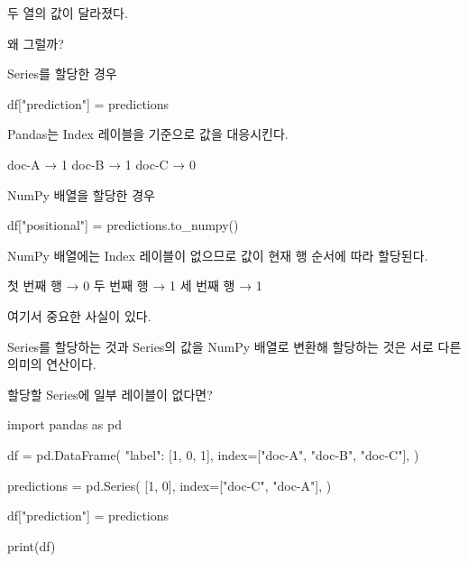 두 열의 값이 달라졌다.

왜 그럴까?

\begin{dhknote}
\begin{dhksmry}[centered]
Series를 할당한 경우
\end{dhksmry}
\end{dhknote}

\begin{dhkcode}
df["prediction"] = predictions
\end{dhkcode}

Pandas는 Index 레이블을 기준으로 값을 대응시킨다.

\begin{dhkzsh}
doc-A → 1
doc-B → 1
doc-C → 0
\end{dhkzsh}

\begin{dhknote}
\begin{dhksmry}[centered]
NumPy 배열을 할당한 경우
\end{dhksmry}
\end{dhknote}

\begin{dhkcode}
df["positional"] = predictions.to_numpy()
\end{dhkcode}

NumPy 배열에는 Index 레이블이 없으므로 값이 현재 행 순서에 따라 할당된다.

\begin{dhkzsh}
첫 번째 행 → 0
두 번째 행 → 1
세 번째 행 → 1
\end{dhkzsh}

여기서 중요한 사실이 있다.

Series를 할당하는 것과 Series의 값을 NumPy 배열로 변환해 할당하는 것은 서로 다른 의미의 연산이다.

\begin{dhknote}
\begin{dhksmry}[centered]
할당할 Series에 일부 레이블이 없다면?
\end{dhksmry}
\end{dhknote}

\begin{dhkcode}
import pandas as pd

df = pd.DataFrame(
    {"label": [1, 0, 1]},
    index=["doc-A", "doc-B", "doc-C"],
)

predictions = pd.Series(
    [1, 0],
    index=["doc-C", "doc-A"],
)

df["prediction"] = predictions

print(df)
\end{dhkcode}

